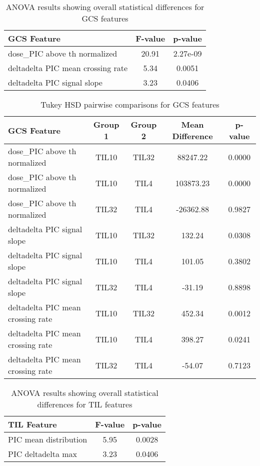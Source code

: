 \documentclass{article}
\begin{document}
	
	\begin{table}[h!]
		\centering
		\begin{tabular}{|l|c|c|}
			\hline
			\textbf{GCS Feature} & \textbf{F-value} & \textbf{p-value} \\ \hline
			dose\_PIC above th normalized & 20.91 & 2.27e-09 \\ \hline
			deltadelta PIC mean crossing rate & 5.34 & 0.0051 \\ \hline
			deltadelta PIC signal slope & 3.23 & 0.0406 \\ \hline
		\end{tabular}
		\caption{ANOVA results showing overall statistical differences for GCS features}
		\label{tab:gcs_anova}
	\end{table}
	
\begin{table}[h!]
	\centering
	\begin{tabular}{|l|c|c|c|c|}
		\hline
		\textbf{GCS Feature} & \textbf{Group 1} & \textbf{Group 2} & \textbf{Mean Difference} & \textbf{p-value} \\ \hline
		dose\_PIC above th normalized & TIL10 & TIL32 & 88247.22 & 0.0000 \\ \hline
		dose\_PIC above th normalized & TIL10 & TIL4 & 103873.23 & 0.0000 \\ \hline
		dose\_PIC above th normalized & TIL32 & TIL4 & -26362.88 & 0.9827 \\ \hline
		deltadelta PIC signal slope & TIL10 & TIL32 & 132.24 & 0.0308 \\ \hline
		deltadelta PIC signal slope & TIL10 & TIL4 & 101.05 & 0.3802 \\ \hline
		deltadelta PIC signal slope & TIL32 & TIL4 & -31.19 & 0.8898 \\ \hline
		deltadelta PIC mean crossing rate & TIL10 & TIL32 & 452.34 & 0.0012 \\ \hline
		deltadelta PIC mean crossing rate & TIL10 & TIL4 & 398.27 & 0.0241 \\ \hline
		deltadelta PIC mean crossing rate & TIL32 & TIL4 & -54.07 & 0.7123 \\ \hline
	\end{tabular}
	\caption{Tukey HSD pairwise comparisons for GCS features}
	\label{tab:gcs_tukey}
\end{table}

	
	\begin{table}[h!]
		\centering
		\begin{tabular}{|l|c|c|}
			\hline
			\textbf{TIL Feature} & \textbf{F-value} & \textbf{p-value} \\ \hline
			PIC mean distribution & 5.95 & 0.0028 \\ \hline
			PIC deltadelta max & 3.23 & 0.0406 \\ \hline
		\end{tabular}
		\caption{ANOVA results showing overall statistical differences for TIL features}
		\label{tab:til_anova}
	\end{table}
	
\end{document}
